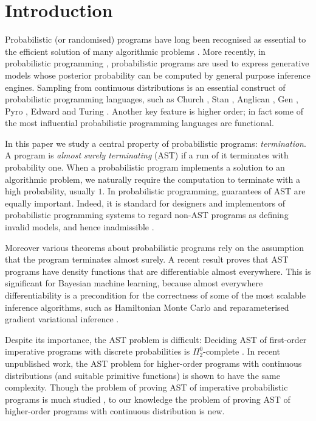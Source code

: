 
\section{Introduction}
\label{sec:intro}

Probabilistic (or randomised) programs have long been recognised as essential to the efficient solution of many algorithmic problems \cite{Rabin1976}.
More recently, in probabilistic programming \cite{DBLP:conf/icse/GordonHNR14,rainforth2017Automating,vandemeent2018Introduction}, probabilistic programs are used to express generative models whose posterior probability can be computed by general purpose inference engines.
Sampling from continuous distributions is an essential construct of probabilistic programming languages, such as Church \cite{DBLP:conf/uai/GoodmanMRBT08}, Stan \cite{carpenter2017stan}, Anglican \cite{DBLP:conf/pkdd/TolpinMW15}, Gen \cite{cusumano-towner2019Gen}, Pyro \cite{bingham2019Pyro}, Edward \cite{tran2016edward} and Turing \cite{ge2018Turing}.
Another key feature is higher order; in fact some of the most influential probabilistic programming languages are functional.

In this paper we study a central property of probabilistic programs: \emph{termination}. 
A program is \emph{almost surely terminating} (AST) if a run of it terminates with probability one.
When a probabilistic program implements a solution to an algorithmic problem, we naturally require the computation to terminate with a high probability, usually $1$.
In probabilistic programming, guarantees of AST are equally important. 
Indeed, it is standard for designers and implementors of probabilistic programming systems to regard non-AST programs as defining invalid models, and hence inadmissible \cite{Rainforth2017,DBLP:conf/uai/GoodmanMRBT08}.

Moreover various theorems about probabilistic programs rely on the assumption that the program terminates almost surely. 
A recent result \cite{MakOPW20} proves that AST programs have density functions that are differentiable almost everywhere.
This is significant for Bayesian machine learning, because almost everywhere differentiability is a precondition for the correctness of some of the most scalable inference algorithms, such as Hamiltonian Monte Carlo \cite{DBLP:conf/aistats/ZhouGKRYW19,Nishimura2020b} and reparameterised gradient variational inference \cite{DBLP:conf/nips/LeeYY18}.

Despite its importance, the AST problem is difficult: 
Deciding AST of first-order imperative programs with discrete probabilities is $\Pi^0_2$-complete \cite{DBLP:conf/mfcs/KaminskiK15}.
In recent unpublished work, the AST problem for higher-order programs with continuous distributions (and suitable primitive functions) is shown to have the same complexity.
Though the problem of proving AST of imperative probabilistic programs is much studied \cite{DBLP:journals/jacm/KaminskiKMO18,DBLP:conf/lics/OlmedoKKM16,DBLP:conf/mfcs/KaminskiK15,DBLP:series/mcs/McIverM05,DBLP:conf/popl/FioritiH15,DBLP:conf/pldi/ChenH20,DBLP:journals/toplas/ChatterjeeFNH18}, to our knowledge the problem of proving AST of higher-order programs with continuous distribution is new.

